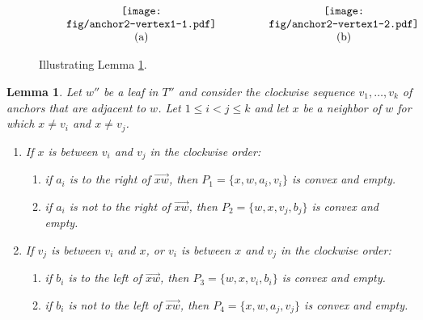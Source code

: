 \documentclass[11pt,a4paper]{article}
\newtheorem{lemma}{Lemma}
\begin{document}
\begin{figure}[ht]
  \centering
\setlength{\tabcolsep}{0in}
  $\begin{tabular}{cc}
  \multicolumn{1}{m{.5\columnwidth}}{\centering\texttt{[image: fig/anchor2-vertex1-1.pdf]}}
  &\multicolumn{1}{m{.5\columnwidth}}{\centering\texttt{[image: fig/anchor2-vertex1-2.pdf]}}
  \\
  (a) & (b)
  \end{tabular}$
  \caption{Illustrating Lemma \ref{anchor2-vertex1-lemma}.}
\label{anchor2-vertex1-1-fig}
\end{figure}

\begin{lemma}
\label{anchor2-vertex1-lemma}
Let $w''$ be a leaf in $T''$ and consider the clockwise sequence $v_1,\dots,v_k$ of anchors that are adjacent to $w$. Let $1\le i < j \le k$ and let $x$ be a neighbor of $w$ for which $x\neq v_i$ and $x\neq v_j$. 
\begin{enumerate}
 \item If $x$ is between $v_i$ and $v_j$ in the clockwise order:
    \begin{enumerate}
      \item if $a_i$ is to the right of $\overrightarrow{xw}$, then $P_1=\{x, w, a_i, v_i\}$ is convex and empty.
      \item if $a_i$ is not to the right of $\overrightarrow{xw}$, then $P_2=\{w, x,v_j, b_j\}$ is convex and empty.
    \end{enumerate}
  \item If $v_j$ is between $v_i$ and $x$, or $v_i$ is between $x$ and $v_j$ in the clockwise order:
    \begin{enumerate}
      \item if $b_i$ is to the left of $\overrightarrow{xw}$, then $P_3=\{w, x, v_i, b_i\}$ is convex and empty.
      \item if $b_i$ is not to the left of $\overrightarrow{xw}$, then $P_4=\{x, w, a_j, v_j\}$ is convex and empty.
    \end{enumerate}
\end{enumerate}
\end{lemma}
\end{document}
